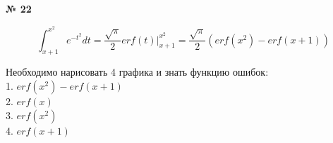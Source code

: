 \documentclass{article}
\begin{document}
\textbf{№ 22} 

$$ \int_{x+1}^{x^2} e^{-t^2} dt
= \frac{\sqrt{\pi}}{2} erf(t) \bigg\vert_{x+1}^{x^2}
= \frac{\sqrt{\pi}}{2} \left( erf(x^2) - erf(x+1)  \right) $$

Необходимо нарисовать 4 графика и знать функцию ошибок: \\
1. $erf(x^2) - erf(x+1)$ \\
2. $erf(x)$ \\
3. $erf(x^2)$ \\
4. $erf(x+1)$
\end{document}
